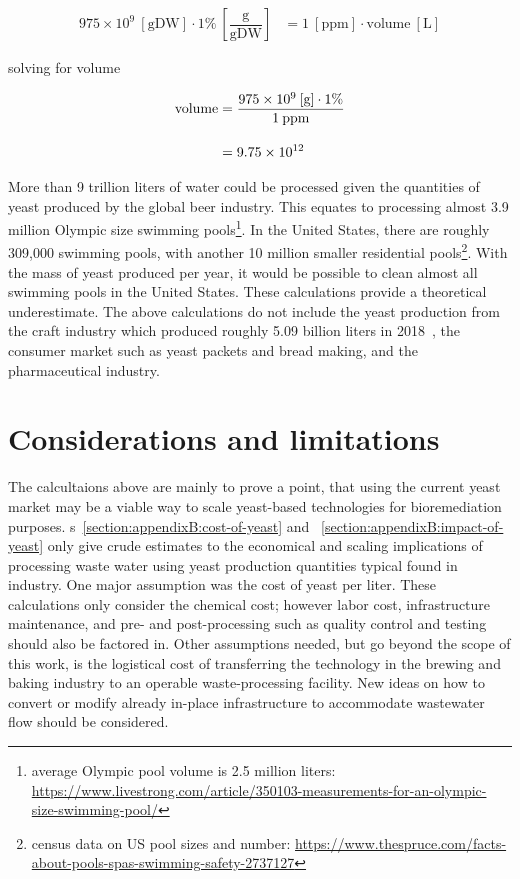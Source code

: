 \documentclass[../main/main]{subfiles}
\begin{document}
\begin{align}
  975 \times 10^{9}\:[\text{gDW}] \cdot 1\%\: \left[\dfrac{\text{g}}{\text{gDW}}\right]
    &= 1\:[\text{ppm}] \cdot \text{volume}\:[\text{L}]
\end{align}

solving for volume

\begin{align}
  \text{volume}
    &= \dfrac{975 \times 10^{9}\:[\text{g}] \cdot 1\%}
      {1\:\text{ppm}}
      \label{equ:volume-water-remediated}
  \\[1em]
    &= 9.75 \times 10^{12}
      \tagaddtext{[\si{\liter}]}
      \nonumber
\end{align}

More than 9 trillion liters of water could be processed given the quantities of yeast produced by the global beer industry. This equates to processing almost 3.9 million Olympic size swimming pools\footnote{
  average Olympic pool volume is 2.5 million liters: \url{https://www.livestrong.com/article/350103-measurements-for-an-olympic-size-swimming-pool/}
}.
In the United States, there are roughly 309,000 swimming pools, with another 10 million smaller residential pools\footnote{
  census data on US pool sizes and number: \url{https://www.thespruce.com/facts-about-pools-spas-swimming-safety-2737127}
}.
With the mass of yeast produced per year, it would be possible to clean almost all swimming pools in the United States. These calculations provide a theoretical underestimate. The above calculations do not include the yeast production from the craft industry which produced roughly 5.09 billion liters in 2018~\cite{demetergroup.n.d.2014}, the consumer market such as yeast packets and bread making, and the pharmaceutical industry.

\section{Considerations and limitations}
The calcultaions above are mainly to prove a point, that using the current yeast market may be a viable way to scale yeast-based technologies for bioremediation purposes. \SECTION{}s~\ref{section:appendixB:cost-of-yeast} and ~\ref{section:appendixB:impact-of-yeast} only give crude estimates to the economical and scaling implications of processing waste water using yeast production quantities typical found in industry. One major assumption was the cost of yeast per liter. These calculations only consider the chemical cost; however labor cost, infrastructure maintenance, and pre- and post-processing such as quality control and testing should also be factored in. Other assumptions needed, but go beyond the scope of this work, is the logistical cost of transferring the technology in the brewing and baking industry to an operable waste-processing facility. New ideas on how to convert or modify already in-place infrastructure to accommodate wastewater flow should be considered.
\end{document}
